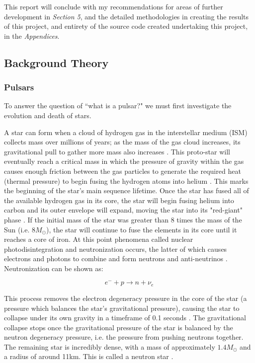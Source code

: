 \documentclass{article}
\begin{document}
This report will conclude with my recommendations for areas of further development in \emph{Section 5}, and the detailed methodologies in creating the results of this project, and entirety of the source code created undertaking this project, in the \emph{Appendices}.

\subsection{Background Theory}

\subsubsection{Pulsars}

To answer the question of ``what is a pulsar?" we must first investigate the evolution and death of stars.

A star can form when a cloud of hydrogen gas in the interstellar medium (ISM) collects mass over millions of years; as the mass of the gas cloud increases, its gravitational pull to gather more mass also increases \autocite{maoz}. This proto-star will eventually reach a critical mass in which the pressure of gravity within the gas causes enough friction between the gas particles to generate the required heat (thermal pressure) to begin fusing the hydrogen atoms into helium \autocite{maoz}. This marks the beginning of the star's main sequence lifetime. Once the star has fused all of the available hydrogen gas in its core, the star will begin fusing helium into carbon and its outer envelope will expand, moving the star into its "red-giant" phase \autocite{maoz}. If the initial mass of the star was greater than 8 times the mass of the Sun (i.e. $8M_{\odot}$), the star will continue to fuse the elements in its core until it reaches a core of iron. At this point phenomena called nuclear photodisintegration and neutronization occurs, the latter of which causes electrons and photons to combine and form neutrons and anti-neutrinos \autocite{maoz}. Neutronization can be shown as:

$$ e^{-}+p\rightarrow n + \nu_e$$

This process removes the electron degeneracy pressure in the core of the star (a pressure which balances the star's gravitational pressure), causing the star to collapse under its own gravity in a timeframe of 0.1 seconds \autocite{maoz}. The gravitational collapse stops once the gravitational pressure of the star is balanced by the neutron degeneracy pressure, i.e. the pressure from pushing neutrons together. The remaining star is incredibly dense, with a mass of approximately $1.4M_{\odot}$ and a radius of around 11km. This is called a neutron star \autocite{maoz}.
\end{document}
